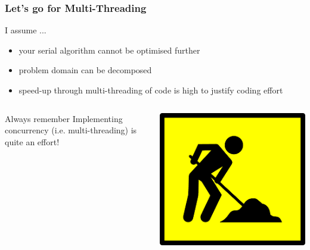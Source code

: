\documentclass[9pt,pdftex]{beamer}
\begin{document}
\begin{frame}
  \frametitle{Let's go for Multi-Threading}
  \begin{block}{I assume ...}
    \begin{itemize}
    \item your serial algorithm cannot be optimised further
    \item problem domain can be decomposed
    \item speed-up through multi-threading of code is high to justify
      coding effort
    \end{itemize}
  \end{block}
  \pause
  \begin{columns}
    \begin{column}{.45\textwidth}
      \begin{alertblock}{Always remember}
        Implementing concurrency (i.e. multi-threading) is quite an effort!\\
      \end{alertblock}
    \end{column}
    \begin{column}{.45\textwidth}
      \begin{center}
        \includegraphics[width=.9\textwidth]{img/nebu_work}\cite{OpenClipart}
      \end{center}
    \end{column}
  \end{columns}

\end{frame}
\end{document}

